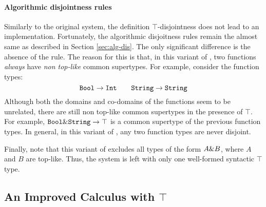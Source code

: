





\paragraph{Algorithmic disjointness rules}

Similarly to the original system, the definition $\top$-disjointness
does not lead to an implementation.  Fortunately, the algorithmic
disjoitness rules remain the almost same as described in Section
\ref{sec:alg-dis}. The only significant difference is the absence
of the  rule. The reason for this is that, in
this variant of \name, two functions \emph{always} have \emph{non top-like} common 
supertypes. For example, consider the function types:
\[ \texttt{Bool} \to \texttt{Int} \qquad \texttt{String} \to \texttt{String} \]
Although both the domains and co-domains of the functions seem 
to be unrelated, there are still non top-like common supertypes in the presence of 
$\top$. For example, $\texttt{Bool}\&\texttt{String} \to \texttt{$\top$}$
is a common supertype of the previous function types. In general, in
this variant of \name, any two function types are never disjoint.

Finally, note that this variant of \name excludes all types of the form
$A \& B$, where $A$  and $B$ are top-like. Thus,
the system is left with only one well-formed syntactic $\top$ type.



\subsection{An Improved Calculus with $\top$}

